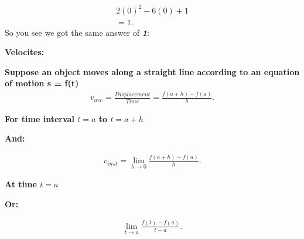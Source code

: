 \documentclass{report}
\begin{document}
        \begin{align*}
            2 \left(0\right)^2 - 6 \left(0\right) + 1 \\ 
            = 1
        .\end{align*}
        \bigbreak \noindent 
        So you see we got the same answer of \textbf{\textit{1}}:

        \pagebreak \bigbreak \noindent
        \begin{large}
            \textbf{Velocites:}
        \end{large}

        \bigbreak \noindent \bigbreak \noindent 
        \textbf{Suppose an object moves along a straight line according to an equation of motion s = f(t)}
        \begin{align*}
            v_{ave} = \frac{Displacement}{Time} = \frac{f(a+ h) - f(a)}{h}
        .\end{align*}

        \bigbreak \noindent 
        \textbf{For time interval $t = a$ to $t = a + h$}
        \begin{center}
            \textbf{And:}
        \end{center}
        \begin{align*}
            v_{inst} = \lim\limits_{h \to 0}{ \frac{f(a+h) - f(a)}{h}}
        .\end{align*}

        \bigbreak \noindent 
        \textbf{At time $t = a$}
        \begin{center}
            \textbf{Or:}
        \end{center}
        \begin{align*}
            \lim\limits_{t \to a}{ \frac{f(t) - f(a)}{t -a}}
        .\end{align*}

        \bigbreak \noindent 
\end{document}

